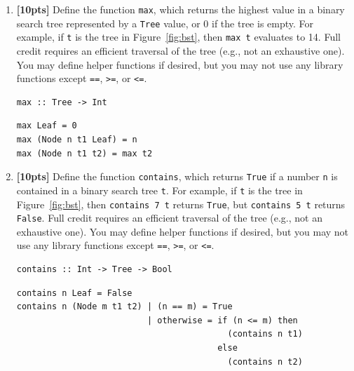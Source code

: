 \documentclass[paper=letter, fontsize=13pt]{article} %
\numberwithin{equation}{section} %
\newif\ifshowanswers\showanswerstrue
\begin{document}
\begin{enumerate}
\begin{enumerate}[label=(\Alph*)]
  \item \textbf{[10pts]} Define the function \texttt{max}, which returns the highest value in a binary search tree represented by a \texttt{Tree} value, or 0 if the tree is empty.  
            For example, if \texttt{t} is the tree in Figure~\ref{fig:bst}, then \texttt{max t} evaluates to 14.  Full credit requires an efficient traversal
            of the tree (e.g., not an exhaustive one). You may define helper functions if desired, but you may not use any library functions except \texttt{==}, \texttt{>=}, or \texttt{<=}.
\begin{lstlisting}
max :: Tree -> Int
\end{lstlisting}
    \ifshowanswers 
\begin{lstlisting}
max Leaf = 0
max (Node n t1 Leaf) = n
max (Node n t1 t2) = max t2
\end{lstlisting}
    \else
     \bigskip 
     \bigskip 
     \bigskip
     \bigskip
     \bigskip
     \bigskip
     \bigskip
     \bigskip
     \bigskip 
     \bigskip
     \bigskip 
     \bigskip
     \bigskip
    \fi


  \item \textbf{[10pts]} Define the function \texttt{contains}, which returns \texttt{True} if a number \texttt{n} is contained in a binary search tree \texttt{t}.
            For example, if \texttt{t} is the tree in Figure~\ref{fig:bst}, then \texttt{contains 7 t} returns \texttt{True}, but \texttt{contains 5 t} returns \texttt{False}.
            Full credit requires an efficient traversal of the tree (e.g., not an exhaustive one). You may define helper functions if desired, but you may not use any 
            library functions except \texttt{==}, \texttt{>=}, or \texttt{<=}. 
\begin{lstlisting}
contains :: Int -> Tree -> Bool
\end{lstlisting}
    \ifshowanswers 
\begin{lstlisting}
contains n Leaf = False
contains n (Node m t1 t2) | (n == m) = True
                          | otherwise = if (n <= m) then 
                                          (contains n t1) 
                                        else 
                                          (contains n t2)
\end{lstlisting}
    \else
     \bigskip 
     \bigskip 
     \bigskip
     \bigskip
     \bigskip
     \bigskip
     \bigskip
     \bigskip
     \bigskip 
     \bigskip
     \bigskip 
     \bigskip
     \bigskip
    \fi

\end{enumerate}
\end{enumerate}
\end{document}
